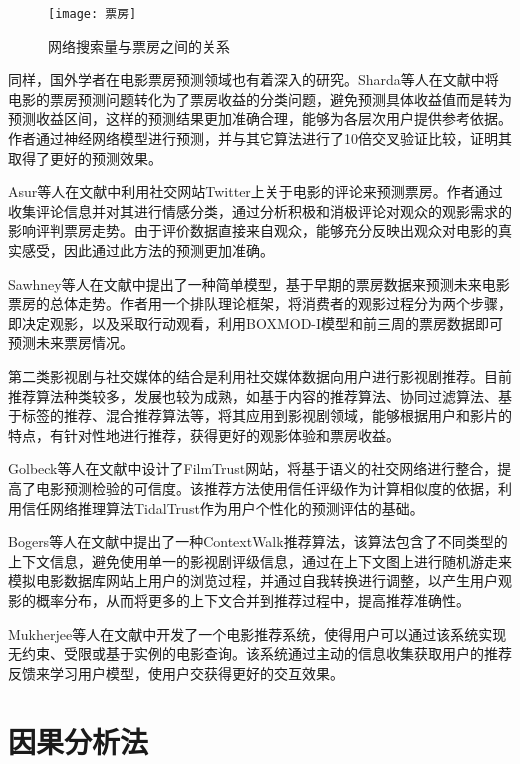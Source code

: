 \begin{figure}[h] 
  \centering
  \texttt{[image: 票房]}
  \caption{网络搜索量与票房之间的关系}
  \label{piaofang}
\end{figure}

同样，国外学者在电影票房预测领域也有着深入的研究。Sharda等人在文献\cite{sharda2006predicting}中将电影的票房预测问题转化为了票房收益的分类问题，避免预测具体收益值而是转为预测收益区间，这样的预测结果更加准确合理，能够为各层次用户提供参考依据。作者通过神经网络模型进行预测，并与其它算法进行了10倍交叉验证比较，证明其取得了更好的预测效果。

Asur等人在文献\cite{asur2010predicting}中利用社交网站Twitter上关于电影的评论来预测票房。作者通过收集评论信息并对其进行情感分类，通过分析积极和消极评论对观众的观影需求的影响评判票房走势。由于评价数据直接来自观众，能够充分反映出观众对电影的真实感受，因此通过此方法的预测更加准确。

Sawhney等人在文献\cite{sawhney1996parsimonious}中提出了一种简单模型，基于早期的票房数据来预测未来电影票房的总体走势。作者用一个排队理论框架，将消费者的观影过程分为两个步骤，即决定观影，以及采取行动观看，利用BOXMOD-I模型和前三周的票房数据即可预测未来票房情况。

第二类影视剧与社交媒体的结合是利用社交媒体数据向用户进行影视剧推荐。目前推荐算法种类较多，发展也较为成熟，如基于内容的推荐算法、协同过滤算法、基于标签的推荐、混合推荐算法等，将其应用到影视剧领域，能够根据用户和影片的特点，有针对性地进行推荐，获得更好的观影体验和票房收益。

Golbeck等人在文献\cite{golbeck2006filmtrust}中设计了FilmTrust网站，将基于语义的社交网络进行整合，提高了电影预测检验的可信度。该推荐方法使用信任评级作为计算相似度的依据，利用信任网络推理算法TidalTrust作为用户个性化的预测评估的基础。

Bogers等人在文献\cite{bogers2010movie}中提出了一种ContextWalk推荐算法，该算法包含了不同类型的上下文信息，避免使用单一的影视剧评级信息，通过在上下文图上进行随机游走来模拟电影数据库网站上用户的浏览过程，并通过自我转换进行调整，以产生用户观影的概率分布，从而将更多的上下文合并到推荐过程中，提高推荐准确性。

Mukherjee等人在文献\cite{mukherjee2003movie}中开发了一个电影推荐系统，使得用户可以通过该系统实现无约束、受限或基于实例的电影查询。该系统通过主动的信息收集获取用户的推荐反馈来学习用户模型，使用户交获得更好的交互效果。

\section{因果分析法}

